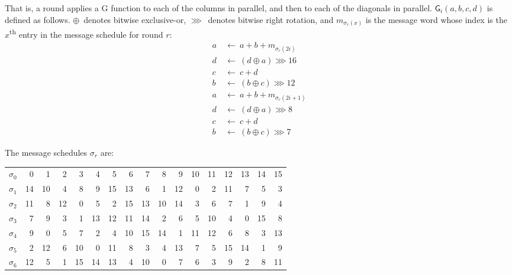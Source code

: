 \documentclass[11pt,notitlepage,a4paper]{article}
\newcommand{\GG}{\mathsf{G}}
\begin{document}
\begin{appendices}
    That is, a round applies a G function to each of the columns in parallel,
    and then to each of the diagonals in parallel. $\GG_i(a, b, c, d)$ is
    defined as follows. $\oplus$~denotes bitwise exclusive-or, $\ggg$~denotes
    bitwise right rotation, and $m_{\sigma_r(x)}$ is the message word whose
    index is the $x$\textsuperscript{th} entry in the message schedule for
    round $r$:
\begin{align*}
    a \ & \leftarrow \ a + b + m_{\sigma_r(2i)} \\
    d \ & \leftarrow \ (d \oplus a) \ggg 16 \\
    c \ & \leftarrow \ c + d \\
    b \ & \leftarrow \ (b \oplus c) \ggg 12 \\
    a \ & \leftarrow \ a + b + m_{\sigma_r(2i+1)} \\
    d \ & \leftarrow \ (d \oplus a) \ggg 8 \\
    c \ & \leftarrow \ c + d \\
    b \ & \leftarrow \ (b \oplus c) \ggg 7
\end{align*}

    The message schedules $\sigma_r$ are:

\begin{center}
\begin{tabular}{ | r | r r r r r r r r r r r r r r r r | }
    \hline
    $\sigma_0$ & 0 & 1 & 2 & 3 & 4 & 5 & 6 & 7 & 8 & 9 & 10 & 11 & 12 & 13 & 14 & 15 \\
    $\sigma_1$ & 14 & 10 & 4 & 8 & 9 & 15 & 13 & 6 & 1 & 12 & 0 & 2 & 11 & 7 & 5 & 3 \\
    $\sigma_2$ & 11 & 8 & 12 & 0 & 5 & 2 & 15 & 13 & 10 & 14 & 3 & 6 & 7 & 1 & 9 & 4 \\
    $\sigma_3$ & 7 & 9 & 3 & 1 & 13 & 12 & 11 & 14 & 2 & 6 & 5 & 10 & 4 & 0 & 15 & 8 \\
    $\sigma_4$ & 9 & 0 & 5 & 7 & 2 & 4 & 10 & 15 & 14 & 1 & 11 & 12 & 6 & 8 & 3 & 13 \\
    $\sigma_5$ & 2 & 12 & 6 & 10 & 0 & 11 & 8 & 3 & 4 & 13 & 7 & 5 & 15 & 14 & 1 & 9 \\
    $\sigma_6$ & 12 & 5 & 1 & 15 & 14 & 13 & 4 & 10 & 0 & 7 & 6 & 3 & 9 & 2 & 8 & 11 \\
    \hline
\end{tabular}
\end{center}



\end{appendices}
\end{document}
